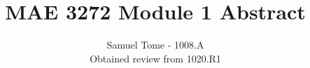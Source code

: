 \documentclass[10pt]{article}
\begin{document}
 
 
\title{MAE 3272 Module 1 Abstract}
\author{Samuel Tome - 1008.A \\ Obtained review from 1020.R1}
\maketitle

\end{document}
